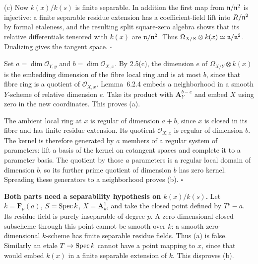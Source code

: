 \documentclass[11pt]{article}
\let\chapterexercise\exercise
\renewcommand{\exercise}[2]{\Needspace{8\baselineskip}\chapterexercise{#1}{#2}}
\begin{document}
(c) Now $k(x)/k(s)$ is finite separable. In addition the first map from $\mathfrak n/\mathfrak n^2$ is injective: a finite separable residue extension has a coefficient-field lift into $R/\mathfrak n^2$ by formal etaleness, and the resulting split square-zero algebra shows that its relative differentials tensored with $k(x)$ are $\mathfrak n/\mathfrak n^2$. Thus $\Omega_{X/S}\otimes k(x)\simeq\mathfrak n/\mathfrak n^2$. Dualizing gives the tangent space. \hfill$\square$

\pf
Set $a=\dim\mathcal O_{Y,y}$ and $b=\dim\mathcal O_{X,x}$. By 2.5(c), the dimension $e$ of $\Omega_{X/Y}\otimes k(x)$ is the embedding dimension of the fibre local ring and is at most $b$, since that fibre ring is a quotient of $\mathcal O_{X,x}$. Lemma~6.2.4 embeds a neighborhood in a smooth $Y$-scheme of relative dimension $e$. Take its product with $\mathbf A^{b-e}_Y$ and embed $X$ using zero in the new coordinates. This proves (a).

The ambient local ring at $x$ is regular of dimension $a+b$, since $x$ is closed in its fibre and has finite residue extension. Its quotient $\mathcal O_{X,x}$ is regular of dimension $b$. The kernel is therefore generated by $a$ members of a regular system of parameters: lift a basis of the kernel on cotangent spaces and complete it to a parameter basis. The quotient by those $a$ parameters is a regular local domain of dimension $b$, so its further prime quotient of dimension $b$ has zero kernel. Spreading these generators to a neighborhood proves (b). \hfill$\square$

\pf
\textbf{Both parts need a separability hypothesis on $k(x)/k(s)$.} Let $k=\mathbf F_p(a)$, $S=\operatorname{Spec} k$, $X=\mathbf A^1_k$, and take the closed point defined by $T^p-a$. Its residue field is purely inseparable of degree $p$. A zero-dimensional closed subscheme through this point cannot be smooth over $k$: a smooth zero-dimensional $k$-scheme has finite separable residue fields. Thus (a) is false. Similarly an etale $T\to\operatorname{Spec} k$ cannot have a point mapping to $x$, since that would embed $k(x)$ in a finite separable extension of $k$. This disproves (b).
\end{document}
